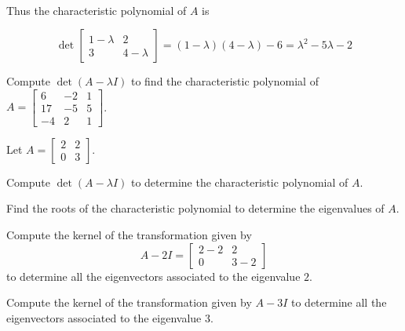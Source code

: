 \begin{applicationActivities}
\begin{definition}
\ \\
Thus the characteristic polynomial of \(A\) is

\[
  \det\begin{bmatrix}1-\lambda & 2 \\ 3 & 4-\lambda\end{bmatrix}
=
  (1-\lambda)(4-\lambda)-6
=
  \lambda^2-5\lambda-2
\]
\end{definition}

\begin{activity}{15}
  Compute $\det(A-\lambda I)$ to find the characteristic polynomial of
  $A=\begin{bmatrix} 6 & -2 & 1 \\ 17 & -5 & 5 \\ -4 & 2 & 1 \end{bmatrix}$.


\end{activity}

\begin{activity}{15}
Let $A = \begin{bmatrix} 2 & 2 \\ 0 & 3 \end{bmatrix}$.
\begin{subactivity}
Compute $\det (A-\lambda I)$ to determine the characteristic polynomial of $A$.
\end{subactivity}
\begin{subactivity}
Find the roots of the characteristic polynomial
to determine the eigenvalues of $A$.
\end{subactivity}
\begin{subactivity}
Compute the kernel of the transformation given by
\[
  A-2I
    =
  \begin{bmatrix} 2-2 & 2 \\ 0 & 3-2 \end{bmatrix}
\] to determine all the eigenvectors associated to the eigenvalue $2$.
\end{subactivity}
\begin{subactivity}
Compute the kernel of the transformation given by $A-3I$ to determine all the eigenvectors associated to the eigenvalue $3$.
\end{subactivity}
\end{activity}


\end{applicationActivities}
